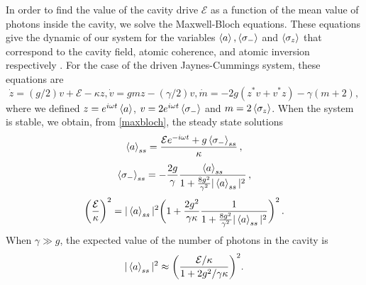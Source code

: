 \documentclass[conference]{IEEEtran}
\begin{document}
In order to find the value of the cavity drive $\mathcal{E}$ as a
function of the mean value of photons inside the cavity, we solve the
Maxwell-Bloch equations. These equations give the dynamic of our
system for the variables $\expval{a}, \expval{\sigma_-}$ and
$\expval{\sigma_z}$ that correspond to the cavity field, atomic
coherence, and atomic inversion respectively \cite{Alsing_1991}. For
the case of the driven Jaynes-Cummings system, these equations are
\begin{subequations} \label{maxbloch}
\begin{equation} \label{bloch1}
\dot{z} = (g/2)v + \mathcal{E} - \kappa z,
\end{equation}
\begin{equation} \label{bloch2}
\dot{v} = gmz - (\gamma/2)v,
\end{equation}
\begin{equation} \label{bloch3}
\dot{m} = -2g(z^*v + v^*z) - \gamma(m + 2),
\end{equation}
\end{subequations} 
where we defined $z = e^{i\omega t}\expval{a}$,
$v = 2e^{i\omega t}\expval{\sigma_-}$ and $m = 2\expval{\sigma_z}$.
When the system is stable, we obtain, from
\eqref{maxbloch}, the steady state
solutions \cite{gagniuc2017markov}
\begin{equation} \label{chaf1}
\expval{a}_{ss} = \frac{\mathcal{E}e^{-i\omega t} +
  g\expval{\sigma_-}_{ss}}{\kappa}\, ,
\end{equation}
\begin{equation} \label{chaf2}
\expval{\sigma_-}_{ss} = -\frac{2g}{\gamma}\frac{\expval{a}_{ss}}{1 +
  \frac{8g^2}{\gamma^2}|\expval{a}_{ss}|^2}\, ,
\end{equation}
\begin{equation}
\bigg(\frac{\mathcal{E}}{\kappa}\bigg)^2 = |\expval{a}_{ss}|^2 \bigg(1
+ \frac{2g^2}{\gamma \kappa}\frac{1}{1 +
  \frac{8g^2}{\gamma^2}|\expval{a}_{ss}|^2}\bigg)^2\, .
\end{equation}
When $\gamma \gg g$, the expected value of the number of photons in
the cavity is 
\begin{equation} \label{numfo}
|\expval{a}_{ss}|^2 \approx \bigg(\frac{\mathcal{E}/\kappa}{1 + 2g^2/\gamma \kappa}\bigg)^2.
\end{equation}
\end{document}
